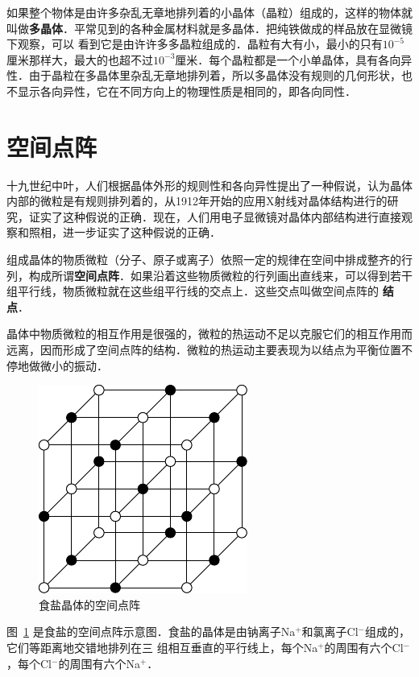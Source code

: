 如果整个物体是由许多杂乱无章地排列着的小晶体（晶粒）组成的，这样的物体就叫做\textbf{多晶体}．平常见到的各种金属材料就是多晶体．把纯铁做成的样品放在显微镜下观察，可以
看到它是由许许多多晶粒组成的．晶粒有大有小，最小的只有$10^{-5}$厘米那样大，最大的也超不过$10^{-3}$厘米．每个晶粒都是一个小单晶体，具有各向异性．由于晶粒在多晶体里杂乱无章地排列着，所以多晶体没有规则的几何形状，也不显示各向异性，它在不同方向上的物理性质是相同的，即各向同性．

\section{空间点阵}
十九世纪中叶，人们根据晶体外形的规则性和各向异性提出了一种假说，认为晶体内部的微粒是有规则排列着的，从1912年开始的应用X射线对晶体结构进行的研究，证实了这种假说的正确．现在，人们用电子显微镜对晶体内部结构进行直接观察和照相，进一步证实了这种假说的正确．

组成晶体的物质微粒（分子、原子或离子）依照一定的规律在空间中排成整齐的行列，构成所谓\textbf{空间点阵}．如果沿着这些物质微粒的行列画出直线来，可以得到若干组平行线，物质微粒就在这些组平行线的交点上．这些交点叫做空间点阵的
\textbf{结点}．

晶体中物质微粒的相互作用是很强的，微粒的热运动不足以克服它们的相互作用而远离，因而形成了空间点阵的结构．微粒的热运动主要表现为以结点为平衡位置不停地做微小的振动．
\begin{figure}[htbp]
    \centering
    \includegraphics{fig/B/4-4.pdf}
    \caption{食盐晶体的空间点阵}\label{fig_B_4-4}
\end{figure}

图~\ref{fig_B_4-4} 是食盐的空间点阵示意图．食盐的晶体是由钠离子Na$^+$和氯离子Cl$^-$组成的，它们等距离地交错地排列在三
组相互垂直的平行线上，每个Na$^+$的周围有六个Cl$^-$，每个Cl$^-$的周围有六个Na$^+$．

